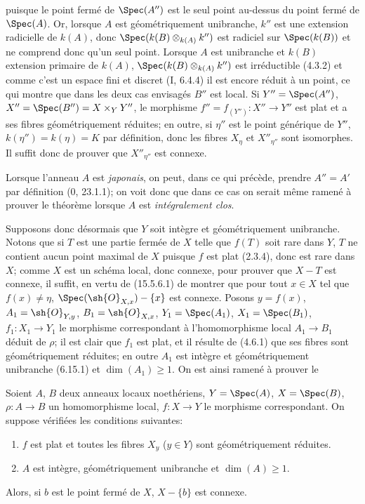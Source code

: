 
puisque le point fermé de $\Spec(A'')$ est le seul point au-dessus du point fermé de $\Spec(A)$. Or, lorsque $A$ est géométriquement unibranche, $k''$ est une extension radicielle de $k(A)$, donc $\Spec(k(B)\otimes_{k(A)}k'')$ est radiciel sur $\Spec(k(B))$ et ne comprend donc qu'un seul point. Lorsque $A$ est unibranche et $k(B)$ extension primaire de $k(A)$, $\Spec(k(B)\otimes_{k(A)}k'')$ est irréductible (4.3.2) et comme c'est un espace fini et discret (I, 6.4.4) il est encore réduit à un point, ce qui montre que dans les deux cas envisagés $B''$ est local. Si $Y''=\Spec(A'')$, $X''=\Spec(B'')=X\times_Y Y''$, le morphisme $f''=f_{(Y'')}:X''\to Y''$ est plat et a ses fibres géométriquement réduites; en outre, si $\eta''$ est le point générique de $Y''$, $k(\eta'')=k(\eta)=K$ par définition, donc les fibres $X_\eta$ et $X''_{\eta''}$ sont isomorphes. Il suffit donc de prouver que $X''_{\eta''}$ est connexe.

\begin{remark}[18.9.7.1]
\label{IV.18.9.7.1}
Lorsque l'anneau $A$ est \emph{japonais}, on peut, dans ce qui précède, prendre $A''=A'$ par définition (0, 23.1.1); on voit donc que dans ce cas on serait même ramené à prouver le théorème lorsque $A$ est \emph{intégralement clos}.
\end{remark}

\begin{env}[18.9.7.2]
\label{IV.18.9.7.2}
Supposons donc désormais que $Y$ soit intègre et géométriquement unibranche. Notons que si $T$ est une partie fermée de $X$ telle que $f(T)$ soit rare dans $Y$, $T$ ne contient aucun point maximal de $X$ puisque $f$ est plat (2.3.4), donc est rare dans $X$; comme $X$ est un schéma local, donc connexe, pour prouver que $X-T$ est connexe, il suffit, en vertu de (15.5.6.1) de montrer que pour tout $x\in X$ tel que $f(x)\neq\eta$, $\Spec(\sh{O}_{X,x})-\{x\}$ est connexe. Posons $y=f(x)$, $A_1=\sh{O}_{Y,y}$, $B_1=\sh{O}_{X,x}$, $Y_1=\Spec(A_1)$, $X_1=\Spec(B_1)$, $f_1:X_1\to Y_1$ le morphisme correspondant à l'homomorphisme local $A_1\to B_1$ déduit de $\rho$; il est clair que $f_1$ est plat, et il résulte de (4.6.1) que ses fibres sont géométriquement réduites; en outre $A_1$ est intègre et géométriquement unibranche (6.15.1) et $\dim(A_1)\geq 1$. On est ainsi ramené à prouver le
\end{env}

\begin{lemma}[18.9.7.3]
\label{IV.18.9.7.3}
Soient $A$, $B$ deux anneaux locaux noethériens, $Y=\Spec(A)$, $X=\Spec(B)$, $\rho:A\to B$ un homomorphisme local, $f:X\to Y$ le morphisme correspondant. On suppose vérifiées les conditions suivantes:
\begin{enumerate}
  \item[(i)] $f$ est plat et toutes les fibres $X_y$ ($y\in Y$) sont géométriquement réduites.
  \item[(ii)] $A$ est intègre, géométriquement unibranche et $\dim(A)\geq 1$.
\end{enumerate}
Alors, si $b$ est le point fermé de $X$, $X-\{b\}$ est connexe.
\end{lemma}

